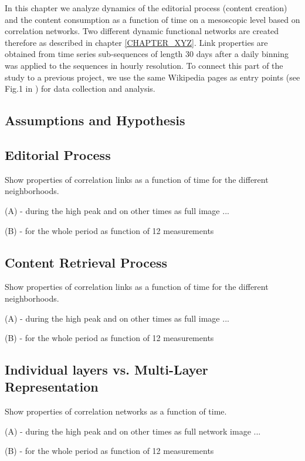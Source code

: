 \documentclass[a4paper,10pt]{scrbook}
\begin{document}
In this chapter we analyze dynamics of the editorial process (content creation) and the content consumption as a function of time on a mesoscopic level based on correlation networks. Two different dynamic functional networks are created therefore as described in chapter \ref{CHAPTER_XYZ}. Link properties are obtained from time series sub-sequences of length 30 days after a daily binning was applied to the sequences in hourly resolution. To connect this part of the study to a previous project, we use the same Wikipedia pages as entry points (see Fig.1 in \cite{Kaempf2012b}) for data collection and analysis. 

\subsection{Assumptions and Hypothesis}


\subsection{Editorial Process}
Show properties of correlation links as a function of time for the different neighborhoods.

(A) - during the high peak and on other times as full image ...

(B) - for the whole period as function of 12 measurements


\subsection{Content Retrieval Process}
Show properties of correlation links as a function of time for the different neighborhoods.

(A) - during the high peak and on other times as full image ...

(B) - for the whole period as function of 12 measurements


\subsection{Individual layers vs. Multi-Layer Representation}

Show properties of correlation networks as a function of time.

(A) - during the high peak and on other times as full network image ...

(B) - for the whole period as function of 12 measurements
\end{document}
